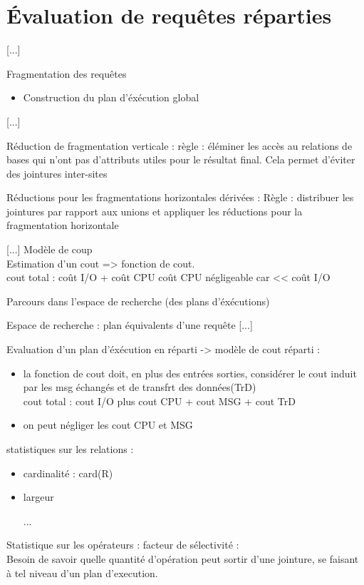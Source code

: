{\newpage

\section{Évaluation de requêtes réparties}

[...]

Fragmentation des requêtes
\begin{itemize}
	\item Construction du plan d'éxécution global
\end{itemize}

[...]

Réduction de fragmentation verticale : règle : éléminer les accès au relations de bases qui n'ont pas d'attributs utiles pour le résultat final. Cela permet d'éviter des jointures inter-sites
\vskip 1cm

Réductions pour les fragmentations horizontales dérivées : Règle : distribuer les jointures par rapport aux unions et appliquer les réductions pour la fragmentation horizontale

\vskip 1cm
[...]
\vskip 1cm
Modèle de coup \\
Estimation d'un cout => fonction de cout.\\
cout total : coût I/O + coût CPU
coût CPU négligeable car << coût I/O

Parcours dans l'espace de recherche (des plans d'éxécutions)

Espace de recherche : plan équivalents d'une requête
\vskip 1cm
[...]
\vskip 1cm

Evaluation d'un plan d'éxécution en réparti
-> modèle de cout réparti : 
\begin{itemize}
	\item  la fonction de cout doit, en plus des entrées sorties, considérer le cout induit par les msg échangés et de transfrt des données(TrD)\\
		cout total : cout I/O plus cout CPU + cout MSG + cout TrD
	\item on peut négliger les cout CPU et MSG
\end{itemize}

statistiques sur les relations :
\begin{itemize}
	\item cardinalité : card(R)
	\item largeur
	\item [...]
\end{itemize}

Statistique sur les opérateurs : facteur de sélectivité : \\
Besoin de savoir quelle quantité d'opération peut sortir d'une jointure, se faisant à tel niveau d'un plan d'execution.

}
